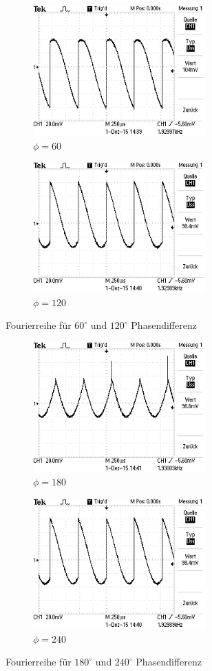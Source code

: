 \begin{figure}
  \centering
  \begin{subfigure}{0.48\textwidth}
    \centering
    \includegraphics[height=5cm]{picture/2.JPG}
    \caption{$\phi = 60$}
  \end{subfigure}
  \begin{subfigure}{0.48\textwidth}
    \centering
    \includegraphics[height=5cm]{picture/3.JPG}
    \caption{$\phi = 120$}
  \end{subfigure}
  \caption{Fourierreihe für $60^{\circ}$ und $120^{\circ}$ Phasendifferenz}
  \label{fig:graph1}
\end{figure}
\begin{figure}
  \centering
  \begin{subfigure}{0.48\textwidth}
    \centering
    \includegraphics[height=5cm]{picture/4.JPG}
    \caption{$\phi = 180$}
  \end{subfigure}
  \begin{subfigure}{0.48\textwidth}
    \centering
    \includegraphics[height=5cm]{picture/3.JPG}
    \caption{$\phi = 240$}
  \end{subfigure}
  \caption{Fourierreihe für $180^{\circ}$ und $240^\circ$ Phasendifferenz}
  \label{fig:graph2}
\end{figure}


